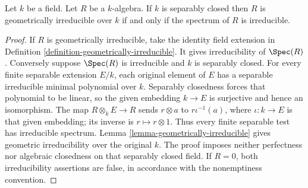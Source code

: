 \begin{lemma}
\label{lemma-separably-closed-irreducible-implies-geometric}
Let $k$ be a field.
Let $R$ be a $k$-algebra.
If $k$ is separably closed then $R$ is
geometrically irreducible over $k$ if and only if the
spectrum of $R$ is irreducible.
\end{lemma}

\begin{proof}
If $R$ is geometrically irreducible,
take the identity field extension in
Definition \ref{definition-geometrically-irreducible}.
It gives irreducibility of $\Spec(R)$.
Conversely suppose $\Spec(R)$ is
irreducible and $k$ is separably closed.
For every finite separable extension
$E/k$, each original element of $E$
has a separable irreducible minimal
polynomial over $k$. Separably closedness
forces that polynomial to be linear,
so the given embedding $k\to E$ is
surjective and hence an isomorphism.
The map $R\otimes_k E\to R$ sends
$r\otimes a$ to $r\iota^{-1}(a)$,
where $\iota:k\to E$ is that given
embedding; its inverse is $r\mapsto r\otimes1$.
Thus every finite separable test has
irreducible spectrum. Lemma
\ref{lemma-geometrically-irreducible}
gives geometric irreducibility over
the original $k$. The proof imposes
neither perfectness nor algebraic
closedness on that separably closed
field. If $R=0$, both irreducibility
assertions are false, in accordance
with the nonemptiness convention.
\end{proof}